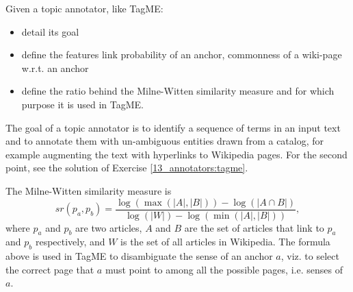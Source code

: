 \exercise

Given a topic annotator, like TagME:
\begin{itemize}
  \item detail its goal
  \item define the features link probability of an anchor, commonness of a
    wiki-page w.r.t. an anchor
  \item define the ratio behind the Milne-Witten similarity measure and for
    which purpose it is used in TagME.
\end{itemize}

\solution

The goal of a topic annotator is to identify a sequence of terms in an input
text and to annotate them with un-ambiguous entities drawn from a catalog, for
example augmenting the text with hyperlinks to Wikipedia pages. For the second
point, see the solution of Exercise \ref{13_annotators:tagme}.

The Milne-Witten similarity measure is
%
$$sr(p_a,p_b) = \frac{\log(\max(|A|,|B|)) - \log(|A \cap B|)}{\log(|W|) -
  \log(\min(|A|,|B|))},$$
%
where $p_a$ and $p_b$ are two articles, $A$ and $B$ are the set of articles that
link to $p_a$ and $p_b$ respectively, and $W$ is the set of all articles in
Wikipedia. The formula above is used in TagME to disambiguate the sense of an
anchor $a$, viz. to select the correct page that $a$ must point to among all the
possible pages, i.e. senses of $a$.